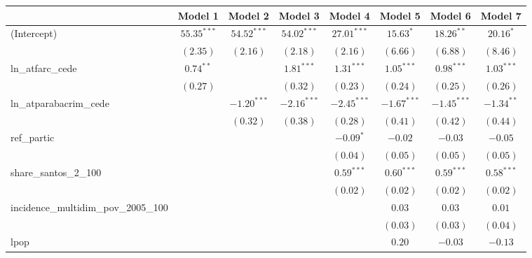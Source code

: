
\usepackage{booktabs}

\begin{tabular}{l c c c c c c c}
\toprule
 & Model 1 & Model 2 & Model 3 & Model 4 & Model 5 & Model 6 & Model 7 \\
\midrule
(Intercept)                         & $55.35^{***}$ & $54.52^{***}$ & $54.02^{***}$ & $27.01^{***}$ & $15.63^{*}$   & $18.26^{**}$  & $20.16^{*}$  \\
                                    & $(2.35)$      & $(2.16)$      & $(2.18)$      & $(2.16)$      & $(6.66)$      & $(6.88)$      & $(8.46)$     \\
ln\_atfarc\_cede                    & $0.74^{**}$   &               & $1.81^{***}$  & $1.31^{***}$  & $1.05^{***}$  & $0.98^{***}$  & $1.03^{***}$ \\
                                    & $(0.27)$      &               & $(0.32)$      & $(0.23)$      & $(0.24)$      & $(0.25)$      & $(0.26)$     \\
ln\_atparabacrim\_cede              &               & $-1.20^{***}$ & $-2.16^{***}$ & $-2.45^{***}$ & $-1.67^{***}$ & $-1.45^{***}$ & $-1.34^{**}$ \\
                                    &               & $(0.32)$      & $(0.38)$      & $(0.28)$      & $(0.41)$      & $(0.42)$      & $(0.44)$     \\
ref\_partic                         &               &               &               & $-0.09^{*}$   & $-0.02$       & $-0.03$       & $-0.05$      \\
                                    &               &               &               & $(0.04)$      & $(0.05)$      & $(0.05)$      & $(0.05)$     \\
share\_santos\_2\_100               &               &               &               & $0.59^{***}$  & $0.60^{***}$  & $0.59^{***}$  & $0.58^{***}$ \\
                                    &               &               &               & $(0.02)$      & $(0.02)$      & $(0.02)$      & $(0.02)$     \\
incidence\_multidim\_pov\_2005\_100 &               &               &               &               & $0.03$        & $0.03$        & $0.01$       \\
                                    &               &               &               &               & $(0.03)$      & $(0.03)$      & $(0.04)$     \\
lpop                                &               &               &               &               & $0.20$        & $-0.03$       & $-0.13$      \\

\end{tabular}
